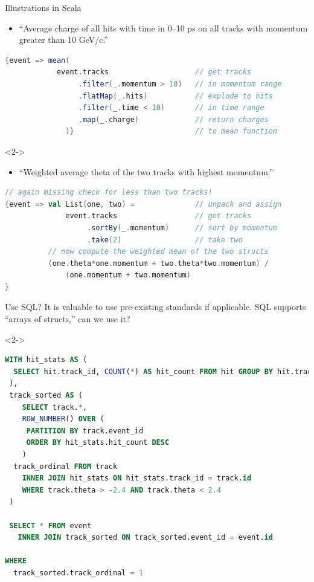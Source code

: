 \documentclass{beamer}
\begin{document}
\begin{frame}[fragile]{Illustrations in Scala}
\vspace{0.35 cm}
\begin{itemize}
\item ``Average charge of all hits with time in 0--10 ps on all tracks with momentum greater than 10 GeV/c.''
\end{itemize}

\begin{lstlisting}[language=scala]
{event => mean(
            event.tracks                    // get tracks
                 .filter(_.momentum > 10)   // in momentum range
                 .flatMap(_.hits)           // explode to hits
                 .filter(_.time < 10)       // in time range
                 .map(_.charge)             // return charges
              )}                            // to mean function
\end{lstlisting}

\begin{uncoverenv}<2->
\begin{itemize}
\item ``Weighted average theta of the two tracks with highest momentum.''
\end{itemize}

\begin{lstlisting}[language=scala]
// again missing check for less than two tracks!
{event => val List(one, two) =              // unpack and assign
              event.tracks                  // get tracks
                   .sortBy(_.momentum)      // sort by momentum
                   .take(2)                 // take two
          // now compute the weighted mean of the two structs
          (one.theta*one.momentum + two.theta*two.momentum) /
              (one.momentum + two.momentum)
}\end{lstlisting}
\end{uncoverenv}
\end{frame}

\begin{frame}[fragile]{Use SQL?}
\vspace{0.3 cm}
It is valuable to use pre-existing standards if applicable. SQL supports ``arrays of structs,'' can we use it? 

\begin{uncoverenv}<2->
\begin{lstlisting}[language=sql, basicstyle=\ttfamily\scriptsize]
 WITH hit_stats AS (
  SELECT hit.track_id, COUNT(*) AS hit_count FROM hit GROUP BY hit.track_id
 ),
 track_sorted AS (
    SELECT track.*, 
    ROW_NUMBER() OVER (
     PARTITION BY track.event_id
     ORDER BY hit_stats.hit_count DESC
    )
  track_ordinal FROM track 
    INNER JOIN hit_stats ON hit_stats.track_id = track.id
    WHERE track.theta > -2.4 AND track.theta < 2.4
 )

 SELECT * FROM event
   INNER JOIN track_sorted ON track_sorted.event_id = event.id

WHERE
  track_sorted.track_ordinal = 1
\end{lstlisting}
\end{uncoverenv}
\end{frame}
\end{document}
